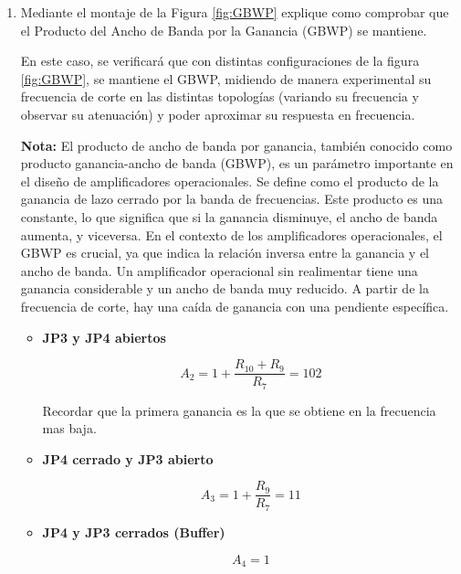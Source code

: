 \begin{enumerate}[label=\textbf{\arabic*.}, font=\bfseries]
    \item Mediante el montaje de la Figura \ref{fig:GBWP} explique como comprobar que el Producto del Ancho de Banda por la Ganancia (GBWP) se mantiene.

        En este caso, se verificará que con distintas configuraciones de la figura \ref{fig:GBWP}, se mantiene el GBWP, midiendo de manera experimental su frecuencia de corte en las distintas topologías (variando su frecuencia y observar su atenuación) y poder aproximar su respuesta en frecuencia.

        \textbf{Nota:} El producto de ancho de banda por ganancia, también conocido como producto ganancia-ancho de banda (GBWP), es un parámetro importante en el diseño de amplificadores operacionales. Se define como el producto de la ganancia de lazo cerrado por la banda de frecuencias. Este producto es una constante, lo que significa que si la ganancia disminuye, el ancho de banda aumenta, y viceversa.
        En el contexto de los amplificadores operacionales, el GBWP es crucial, ya que indica la relación inversa entre la ganancia y el ancho de banda. Un amplificador operacional sin realimentar tiene una ganancia considerable y un ancho de banda muy reducido. A partir de la frecuencia de corte, hay una caída de ganancia con una pendiente específica.

        \begin{itemize}
            \item \textbf{JP3 y JP4 abiertos}

                \begin{equation}
                    A_{2} = 1+ \frac{R_{10}+R_{9}}{R_{7}} = 102
                    \label{eqn:A2}
                \end{equation}

                Recordar que la primera ganancia es la que se obtiene en la frecuencia mas baja.

            \item \textbf{JP4 cerrado y JP3 abierto}

                \begin{equation}
                    A_{3} = 1+ \frac{R_{9}}{R_{7}} = 11
                    \label{eqn:A3}
                \end{equation}

            \item \textbf{JP4 y JP3 cerrados (Buffer)}

                \begin{equation}
                    A_{4} = 1 
                    \label{eqn:A4}
                \end{equation}


\end{itemize}
\end{enumerate}
